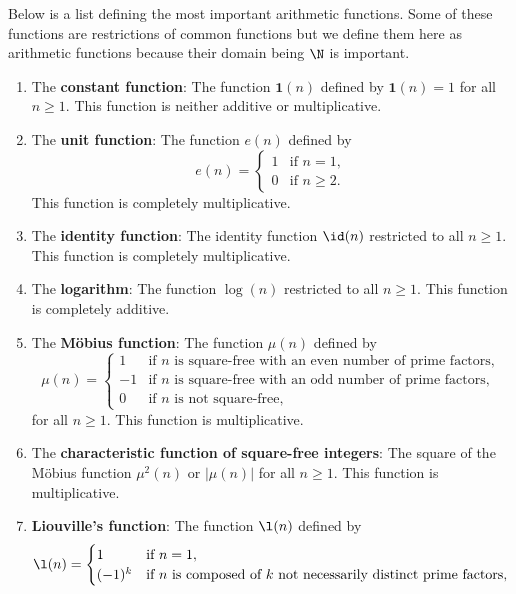     Below is a list defining the most important arithmetic functions. Some of these functions are restrictions of common functions but we define them here as arithmetic functions because their domain being $\N$ is important.
    \begin{enumerate}[label=(\roman*)]
      \item The \textbf{constant function}: The function $\mathbf{1}(n)$ defined by $\mathbf{1}(n) = 1$ for all $n \ge 1$. This function is neither additive or multiplicative.
      \item The \textbf{unit function}: The function $e(n)$ defined by
      \[
        e(n) = \begin{cases} 1 & \text{if $n = 1$}, \\ 0 & \text{if $n \ge 2$}. \end{cases}
      \]
      This function is completely multiplicative.
      \item The \textbf{identity function}: The identity function $\id(n)$ restricted to all $n \ge 1$. This function is completely multiplicative.
      \item The \textbf{logarithm}: The function $\log(n)$ restricted to all $n \ge 1$. This function is completely additive.
      \item The \textbf{M\"obius function}: The function $\mu(n)$ defined by
      \[
        \mu(n) = \begin{cases} 1 & \text{if $n$ is square-free with an even number of prime factors}, \\ -1 & \text{if $n$ is square-free with an odd number of prime factors}, \\ 0 & \text{if $n$ is not square-free}, \end{cases}
      \]
      for all $n \ge 1$. This function is multiplicative.
      \item The \textbf{characteristic function of square-free integers}: The square of the M\"obius function $\mu^{2}(n)$ or $|\mu(n)|$ for all $n \ge 1$. This function is multiplicative.
      \item \textbf{Liouville's function}: The function $\l(n)$ defined by
      \[
        \l(n) = \begin{cases} 1 & \text{if $n = 1$}, \\ (-1)^{k} & \text{if $n$ is composed of $k$ not necessarily distinct prime factors}, \end{cases}
\]
\end{enumerate}

